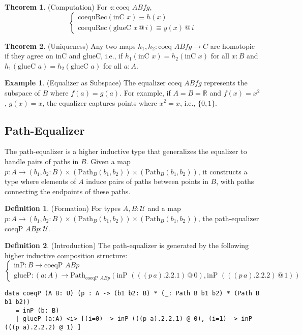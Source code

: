 \documentclass{article}
\theoremstyle{definition}
\newtheorem{theorem}{Theorem}
\newtheorem{definition}{Definition}
\newtheorem{example}{Example}
\begin{document}
\begin{theorem} (Computation)
For $z : \text{coeq } A B f g$,
\[
\begin{cases}
\text{coequRec}(\text{inC } x) \equiv h(x) \\
\text{coequRec}(\text{glueC } x \, @ \, i) \equiv y(x) \, @ \, i
\end{cases}
\]
\end{theorem}

\begin{theorem} (Uniqueness)
Any two maps $h_1, h_2 : \text{coeq } A B f g \to C$ are homotopic if they agree on $\text{inC}$ and $\text{glueC}$, i.e., if $h_1(\text{inC } x) = h_2(\text{inC } x)$ for all $x : B$ and $h_1(\text{glueC } a) = h_2(\text{glueC } a)$ for all $a : A$.
\end{theorem}

\begin{example} (Equalizer as Subspace)
The equalizer $\text{coeq } A B f g$ represents the subspace of $B$ where $f(a) = g(a)$. For example, if $A = B = \mathbb{R}$ and $f(x) = x^2$, $g(x) = x$, the equalizer captures points where $x^2 = x$, i.e., $\{0, 1\}$.
\end{example}

\subsection{Path-Equalizer}
The path-equalizer is a higher inductive type that generalizes the equalizer to handle pairs of paths in $B$. Given a map $p : A \to (b_1, b_2 : B) \times (\text{Path}_B (b_1, b_2)) \times (\text{Path}_B (b_1, b_2))$, it constructs a type where elements of $A$ induce pairs of paths between points in $B$, with paths connecting the endpoints of these paths.

\begin{definition} (Formation)
For types $A, B : \mathcal{U}$ and a map $p : A \to (b_1, b_2 : B) \times (\text{Path}_B (b_1, b_2)) \times (\text{Path}_B (b_1, b_2))$, the path-equalizer $\text{coeqP } A B p : \mathcal{U}$.
\end{definition}

\begin{definition} (Introduction)
The path-equalizer is generated by the following higher inductive composition structure:
\[
\begin{cases}
\text{inP} : B \to \text{coeqP } A B p \\
\text{glueP} : (a : A) \to \text{Path}_{\text{coeqP } A B p} (\text{inP } (((p \, a).2.2.1) \, @ \, 0), \text{inP } (((p \, a).2.2.2) \, @ \, 1))
\end{cases}
\]
\begin{lstlisting}
data coeqP (A B: U) (p : A -> (b1 b2: B) * (_: Path B b1 b2) * (Path B b1 b2))
   = inP (b: B)
   | glueP (a:A) <i> [(i=0) -> inP (((p a).2.2.1) @ 0), (i=1) -> inP (((p a).2.2.2) @ 1) ]
\end{lstlisting}
\end{definition}
\end{document}
